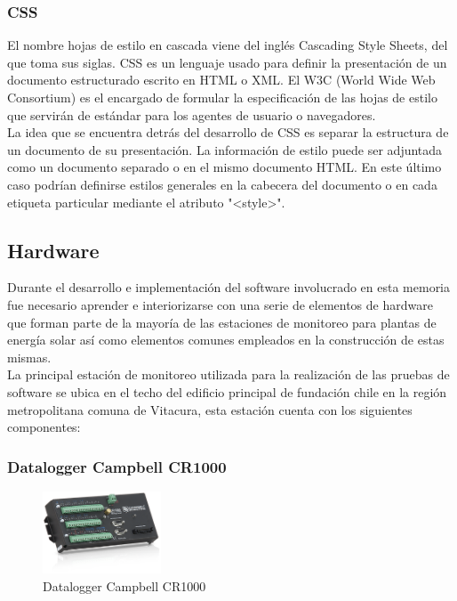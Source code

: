 \subsubsection{CSS}
El nombre hojas de estilo en cascada viene del inglés Cascading Style Sheets, del que toma sus siglas. CSS es un lenguaje usado para definir la presentación de un documento estructurado escrito en HTML o XML. El W3C (World Wide Web Consortium) es el encargado de formular la especificación de las hojas de estilo que servirán de estándar para los agentes de usuario o navegadores.\\

La idea que se encuentra detrás del desarrollo de CSS es separar la estructura de un documento de su presentación.
La información de estilo puede ser adjuntada como un documento separado o en el mismo documento HTML. En este último caso podrían definirse estilos generales en la cabecera del documento o en cada etiqueta particular mediante el atributo "<style>".

\subsection{Hardware}
Durante el desarrollo e implementación del software involucrado en esta memoria fue necesario aprender e interiorizarse con una serie de elementos de hardware que forman parte de la mayoría de las estaciones de monitoreo para plantas de energía solar así como elementos comunes empleados en la construcción de estas mismas.\\

La principal estación de monitoreo utilizada para la realización de las pruebas de software se ubica en el techo del edificio principal de fundación chile en la región metropolitana comuna de Vitacura, esta estación cuenta con los siguientes componentes:

\subsubsection{Datalogger Campbell CR1000}
\begin{figure}[h!]
	\centering
	\includegraphics[width=100pt]{images/cr1000}
	\caption{Datalogger Campbell CR1000}
\end{figure}
 
